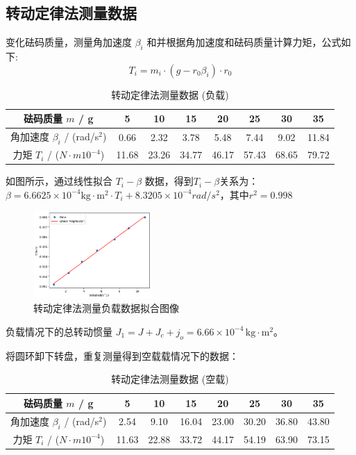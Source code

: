 \documentclass[UTF8]{ctexart}
\begin{document}
\subsection{转动定律法测量数据}
变化砝码质量，测量角加速度 \(\beta_i\) 和并根据角加速度和砝码质量计算力矩，公式如下:
\begin{equation}
    T_i = m_i\cdot(g - r_0\beta_i)\cdot r_0
\end{equation}
\begin{table}[h]
    \centering
    \caption{转动定律法测量数据 (负载)}
    \begin{tabular}{cccccccc}
        \toprule
        砝码质量 \(m\) / g & 5 & 10 & 15 & 20 & 25 & 30 & 35 \\
        \midrule
        角加速度 \(\beta_i\) / (rad/s\(^2\)) & 0.66 & 2.32 & 3.78 & 5.48 & 7.44 & 9.02 & 11.84 \\
        力矩 \(T_i\) / ($N\cdot m 10^{-4}$) & 11.68 & 23.26 & 34.77 & 46.17 & 57.43 & 68.65 & 79.72 \\
        \bottomrule
    \end{tabular}
\end{table}

如图所示，通过线性拟合 \(T_i - \beta\) 数据，得到\(T_i - \beta\)关系为：$\beta = 6.6625 \times 10^{-4}\text{kg} \cdot \text{m}^2\cdot T_i +8.3205 \times 10^{-4} rad/s^2$，其中$r^2=0.998$
\\
\begin{figure}[htbp]
    \centering
    \includegraphics[width=0.4\textwidth]{picture1.png}
    \caption{转动定律法测量负载数据拟合图像}
\end{figure}

负载情况下的总转动惯量 \(J_1 = J+J_c+j_o = 6.66 \times 10^{-4} \, \text{kg} \cdot \text{m}^2\)。

将圆环卸下转盘，重复测量得到空载载情况下的数据：
\begin{table}[h]
    \centering
    \caption{转动定律法测量数据 (空载)}
    \begin{tabular}{cccccccc}
        \toprule
        砝码质量 \(m\) / g & 5 & 10 & 15 & 20 & 25 & 30 & 35 \\
        \midrule
        角加速度 \(\beta_i\) / (rad/s\(^2\)) & 2.54 & 9.10 & 16.04 & 23.00 & 30.20 & 36.80 & 43.80 \\
        力矩 \(T_i\) / ($N\cdot m 10^{-4}$) & 11.63 & 22.88 & 33.72 & 44.17 & 54.19 & 63.90 & 73.15 \\
        \bottomrule
    \end{tabular}
\end{table}
\end{document}

